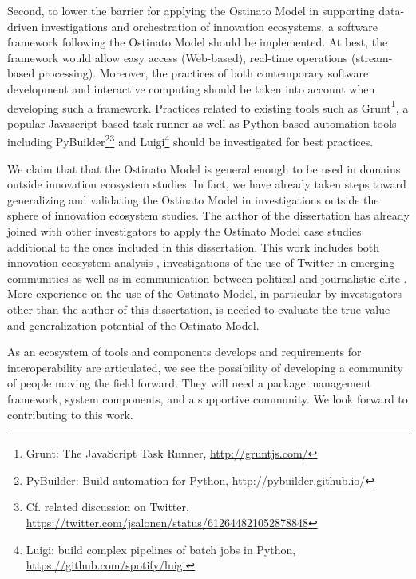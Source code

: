 Second, to lower the barrier for applying the Ostinato Model in supporting data-driven investigations and orchestration of innovation ecosystems, a software framework following the Ostinato Model should be implemented. At best, the framework would allow easy access (Web-based), real-time operations (stream-based processing). Moreover, the practices of both contemporary software development and interactive computing should be taken into account when developing such a framework. Practices related to existing tools such as Grunt\footnote{Grunt: The JavaScript Task Runner, \url{http://gruntjs.com/}}, a popular Javascript-based task runner as well as Python-based automation tools including PyBuilder\footnote{PyBuilder: Build automation for Python, \url{http://pybuilder.github.io/}}\footnote{Cf. related discussion on Twitter, \url{https://twitter.com/jsalonen/status/612644821052878848}} and Luigi\footnote{Luigi: build complex pipelines of batch jobs in Python, \url{https://github.com/spotify/luigi}} should be investigated for best practices.

We claim that that the Ostinato Model is general enough to be used in domains outside innovation ecosystem studies. In fact, we have already taken steps toward generalizing and validating the Ostinato Model in investigations outside the sphere of innovation ecosystem studies. The author of the dissertation has already joined with other investigators to apply the Ostinato Model case studies additional to the ones included in this dissertation. This work includes both innovation ecosystem analysis \citep{Russell2015RelationalEcosystems}, investigations of the use of Twitter in emerging communities \citep{Aramo-Immonen2015ExploringData,Jussila2014,Aramo-Immonen2015VisualizingModel} as well as in communication between political and journalistic elite 
\citep{Ruoho2015,Vainikka2015TviittienTwitterissa}. More experience on the use of the Ostinato Model, in particular by investigators other than the author of this dissertation, is needed to evaluate the true value and generalization potential of the Ostinato Model.

As an ecosystem of tools and components develops and requirements for interoperability are articulated, we see the possibility of developing a community of people moving the field forward. They will need a package management framework, system components, and a supportive community. We look forward to contributing to this work.